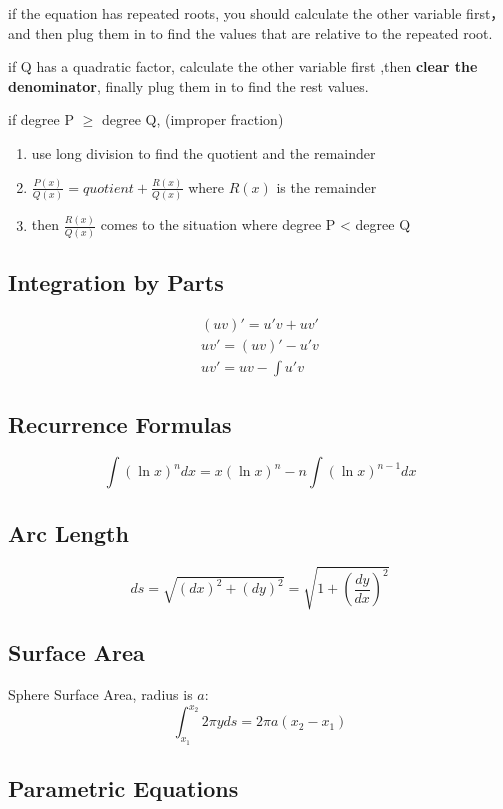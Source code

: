 \documentclass{article}
\begin{document}
if the equation has repeated roots, you should calculate the other variable first， and then plug them in to find the values that are relative to the repeated root.

if Q has a quadratic factor, calculate the other variable first ,then \textbf{clear the denominator}, finally plug them in to find the rest values.

if degree P $\geq$ degree Q, (improper fraction)
\begin{enumerate}
  \item use long division to find the quotient and the remainder
  \item $\frac{P(x)}{Q(x)} = quotient + \frac{R(x)}{Q(x)}$ where $R(x)$ is the remainder
  \item then $\frac{R(x)}{Q(x)}$ comes to the situation where degree P < degree Q
\end{enumerate}

\subsection{Integration by Parts}
\begin{gather*}
  (uv)' = u'v + uv' \\
  uv' = (uv)' - u'v \\
  uv' = uv - \int u'v
\end{gather*}

\subsection{Recurrence Formulas}
$$ \int(\ln x)^ndx = x(\ln x)^{n} - n\int (\ln x)^{n-1}dx$$

\subsection{Arc Length}

$$ds = \sqrt{(dx)^2 + (dy)^2} = \sqrt{1 + (\frac{dy}{dx})^2}$$

\subsection{Surface Area}

Sphere Surface Area, radius is $a$:
$$\int_{x_1}^{x_2} 2\pi yds = 2\pi a(x_2-x_1)$$

\subsection{Parametric Equations}
\end{document}
